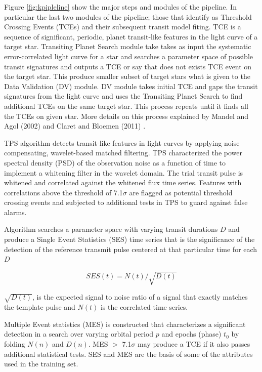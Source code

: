 Figure \ref{fig:kpipleline} show the major steps and modules of the pipeline. In particular the last two modules of the pipeline; those that identify as Threshold Crossing Events (TCEs) and their subsequent transit model fiting. TCE is a sequence of significant, periodic, planet transit-like features in the light curve of a target star. Transiting Planet Search module take takes as input the systematic error-correlated light curve for a star and searches a parameter space of possible transit signatures and outputs a TCE or say that does not exists TCE event on the target star. This produce smaller subset of target stars what is given to the Data Validation (DV) module. DV module takes initial TCE and gaps the transit signatures from the light curve and uses the Transiting Planet Search to find additional TCEs on the same target star. This process repeats until it finds all the TCEs on given star. More details on this process explained by Mandel and Agol (2002) \cite{2002ApJ...580L.171M} and Claret and Bloemen (2011) \cite{2011yCat..35290075C}. 

TPS algorithm detects transit-like features in light curves by applying noise compensating, wavelet-based matched filtering. TPS characterized the power spectral density (PSD) of the observation noise as a function of time to implement a whitening filter in the wavelet domain. The trial transit pulse is whitened and correlated against the whitened flux time series. Features with correlations above the threshold of 7.1$\sigma$ are flagged as potential threshold crossing events and subjected to additional tests in TPS to guard against false alarms.

Algorithm searches a parameter space with varying transit durations $D$ and produce a Single Event Statistics (SES) time series that is the significance of the detection of the reference transmit pulse centered at that particular time for each $D$

\begin{equation}\label{eq:ses}
	SES(t) = N(t) /\sqrt{D(t)}
\end{equation}

$\sqrt{D(t)}$, is the expected signal to noise ratio of a signal that exactly matches the template pulse and $N(t)$ is the correlated time series.



Multiple Event statistics (MES) is constructed that characterizes a significant detection in a search over varying orbital period $p$ and epochs (phase) $t_0$ by folding $N(n)$ and $D(n)$. MES  $>$ 7.1$\sigma$ may produce a TCE if it also passes additional statistical tests. SES and MES are the basis of some of the attributes used in the training set.



